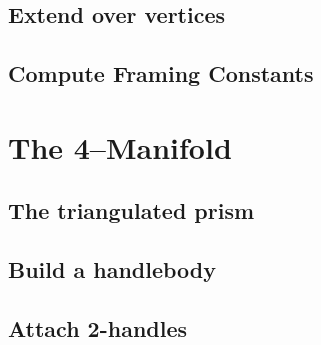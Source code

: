 	\subsection{Extend over vertices}
	
	
	\subsection{Compute Framing Constants}
	

\section{The 4--Manifold}
\label{sec:4man}

	\subsection{The triangulated prism}
	
	
	\subsection{Build a handlebody}
	
	
	\subsection{Attach 2-handles}
	

